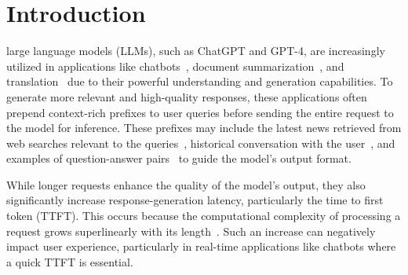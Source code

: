 \section{Introduction}
\label{intro}

 large language models (LLMs), such as ChatGPT and GPT-4, are increasingly utilized in applications like chatbots~\cite{chatgpt-23, chatbotmed-23}, document summarization~\cite{summarization-23, summarization2-22}, and translation~\cite{gpt4trans-23, goodgpttrans-23} due to their powerful understanding and generation capabilities. To generate more relevant and high-quality responses, these applications often prepend context-rich prefixes to user queries before sending the entire request to the model for inference. These prefixes may include the latest news retrieved from web searches relevant to the queries~\cite{rag-nips20}, historical conversation with the user~\cite{attentionstore-atc24}, and examples of question-answer pairs~\cite{chameleon-nips23} to guide the model's output format.

While longer requests enhance the quality of the model's output, they also
significantly increase response-generation latency, particularly the time to
first token (TTFT). This occurs because the computational complexity of
processing a request grows superlinearly with its length~\cite{alluneed-nips17}.
Such an increase can negatively impact user experience, particularly in real-time applications like chatbots where a quick TTFT is essential.


